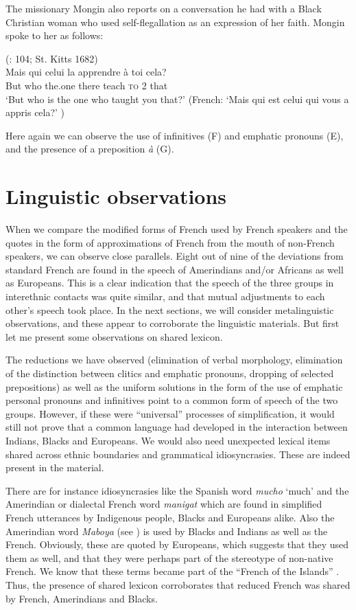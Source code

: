 \documentclass[output=paper,colorlinks,citecolor=brown]{langscibook}
\begin{document}
The missionary Mongin also reports on a conversation he had with a Black Christian woman who used self-flegallation as an expression of her faith. Mongin spoke to her as follows:

\ea
(\citealt{Chatillon1984}: 104; St. Kitts 1682)\\ 
\gll  Mais qui celui la apprendre \`{a} toi cela?\\
 But who the.one there teach \textsc{to} 2 that\\
\glt  `But who is the one who taught you that?'
 (French: `Mais qui est celui qui vous a appris cela?' )
\z

Here again we can observe the use of infinitives (F) and emphatic pronouns (E), and the presence of a preposition \textit{à }(G)\textit{.}

\section{Linguistic observations} \label{sec:bakker:4}
When we compare the modified forms of French used by French speakers and the quotes in the form of approximations of French from the mouth of non-French speakers, we can observe close parallels. Eight out of nine of the deviations from standard French are found in the speech of Amerindians and/or Africans as well as Europeans. This is a clear indication that the speech of the three groups in interethnic contacts was quite similar, and that mutual adjustments to each other’s speech took place. In the next sections, we will consider metalinguistic observations, and these appear to corroborate the linguistic materials. But first let me present some observations on shared lexicon.

The reductions we have observed (elimination of verbal morphology, elimination of the distinction between clitics and emphatic pronouns, dropping of selected prepositions) as well as the uniform solutions in the form of the use of emphatic personal pronouns and infinitives point to a common form of speech of the two groups. However, if these were “universal” processes of simplification, it would still not prove that a common language had developed in the interaction between Indians, Blacks and Europeans. We would also need unexpected lexical items shared across ethnic boundaries and grammatical idiosyncrasies. These are indeed present in the material.

There are for instance idiosyncrasies like the Spanish word \textit{mucho} `much'  and the Amerindian or dialectal French word \textit{manigat} which are found in simplified French utterances by Indigenous people, Blacks and Europeans alike. Also the Amerindian word \textit{Maboya} (see \citealt{Bakker2022}) is used by Blacks and Indians as well as the French. Obviously, these are quoted by Europeans, which suggests that they used them as well, and that they were perhaps part of the stereotype of non-native French. We know that these terms became part of the “French of the Islands” \citep{Jansen2012}. Thus, the presence of shared lexicon corroborates that reduced French was shared by French, Amerindians and Blacks.
\end{document}
